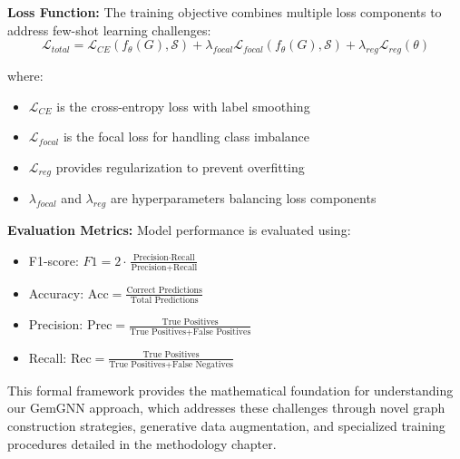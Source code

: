 \textbf{Loss Function:} The training objective combines multiple loss components to address few-shot learning challenges:
\begin{equation}
\mathcal{L}_{total} = \mathcal{L}_{CE}(f_{\theta}(G), \mathcal{S}) + \lambda_{focal} \mathcal{L}_{focal}(f_{\theta}(G), \mathcal{S}) + \lambda_{reg} \mathcal{L}_{reg}(\theta)
\end{equation}

where:
\begin{itemize}
\item $\mathcal{L}_{CE}$ is the cross-entropy loss with label smoothing
\item $\mathcal{L}_{focal}$ is the focal loss for handling class imbalance
\item $\mathcal{L}_{reg}$ provides regularization to prevent overfitting
\item $\lambda_{focal}$ and $\lambda_{reg}$ are hyperparameters balancing loss components
\end{itemize}

\textbf{Evaluation Metrics:} Model performance is evaluated using:
\begin{itemize}
\item F1-score: $F1 = 2 \cdot \frac{\text{Precision} \cdot \text{Recall}}{\text{Precision} + \text{Recall}}$
\item Accuracy: $\text{Acc} = \frac{\text{Correct Predictions}}{\text{Total Predictions}}$
\item Precision: $\text{Prec} = \frac{\text{True Positives}}{\text{True Positives} + \text{False Positives}}$
\item Recall: $\text{Rec} = \frac{\text{True Positives}}{\text{True Positives} + \text{False Negatives}}$
\end{itemize}

This formal framework provides the mathematical foundation for understanding our GemGNN approach, which addresses these challenges through novel graph construction strategies, generative data augmentation, and specialized training procedures detailed in the methodology chapter.

\EndChapter
